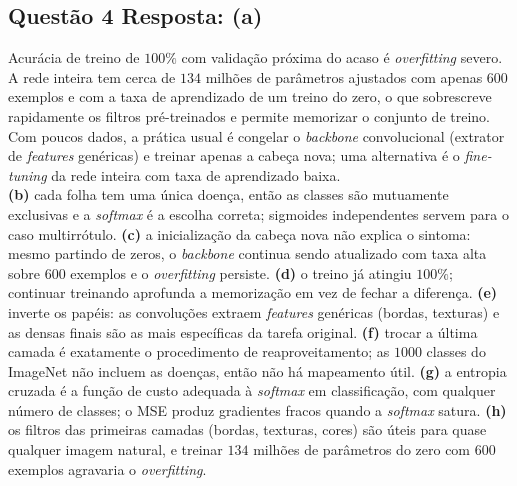 \documentclass[11pt,a4paper]{article}
\begin{document}
\subsection*{Questão 4 \textemdash{} Resposta: (a)}
Acurácia de treino de $100\%$ com validação próxima do acaso é \textit{overfitting} severo. A rede inteira tem cerca de $134$ milhões de parâmetros ajustados com apenas $600$ exemplos e com a taxa de aprendizado de um treino do zero, o que sobrescreve rapidamente os filtros pré-treinados e permite memorizar o conjunto de treino. Com poucos dados, a prática usual é congelar o \textit{backbone} convolucional (extrator de \textit{features} genéricas) e treinar apenas a cabeça nova; uma alternativa é o \textit{fine-tuning} da rede inteira com taxa de aprendizado baixa.\\
\textbf{(b)} cada folha tem uma única doença, então as classes são mutuamente exclusivas e a \textit{softmax} é a escolha correta; sigmoides independentes servem para o caso multirrótulo.
\textbf{(c)} a inicialização da cabeça nova não explica o sintoma: mesmo partindo de zeros, o \textit{backbone} continua sendo atualizado com taxa alta sobre $600$ exemplos e o \textit{overfitting} persiste.
\textbf{(d)} o treino já atingiu $100\%$; continuar treinando aprofunda a memorização em vez de fechar a diferença.
\textbf{(e)} inverte os papéis: as convoluções extraem \textit{features} genéricas (bordas, texturas) e as densas finais são as mais específicas da tarefa original.
\textbf{(f)} trocar a última camada é exatamente o procedimento de reaproveitamento; as $1000$ classes do ImageNet não incluem as doenças, então não há mapeamento útil.
\textbf{(g)} a entropia cruzada é a função de custo adequada à \textit{softmax} em classificação, com qualquer número de classes; o MSE produz gradientes fracos quando a \textit{softmax} satura.
\textbf{(h)} os filtros das primeiras camadas (bordas, texturas, cores) são úteis para quase qualquer imagem natural, e treinar $134$ milhões de parâmetros do zero com $600$ exemplos agravaria o \textit{overfitting}.
\end{document}
